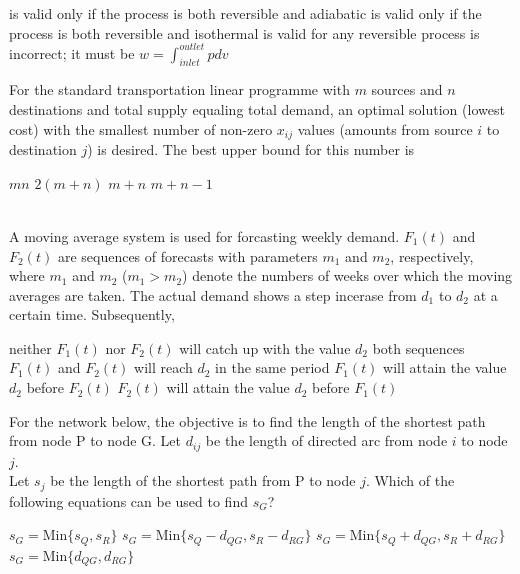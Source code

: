 \documentclass[addpoints,11pt]{exam}
\begin{document}
\begin{questions}
        \begin{choices}
            \choice is valid only if the process is both reversible and adiabatic
            \choice is valid only if the process is both reversible and isothermal
            \choice is valid for any reversible process
            \choice is incorrect; it must be $w=\int_{inlet}^{outlet} pdv$
        \end{choices}

        \question For the standard transportation linear programme with $m$ sources and $n$ destinations and total supply equaling total demand, an optimal solution (lowest cost) with the smallest number of non-zero $x_{ij}$ values (amounts from source $i$ to destination $j$) is desired. The best upper bound for this number is\\

        \begin{oneparchoices}
            \choice $mn$
            \choice $2(m+n)$
            \choice $m+n$
            \choice $m+n-1$
        \end{oneparchoices}\\

        \question A moving average system is used for forcasting weekly demand. $F_1(t)$ and $F_2(t)$ are sequences of forecasts with parameters $m_1$ and $m_2$, respectively, where $m_1$ and $m_2$ ($m_1>m_2$) denote the numbers of weeks over which the moving averages are taken. The actual demand shows a step incerase from $d_1$ to $d_2$ at a certain time. Subsequently,\\

    \begin{choices}
        \choice neither $F_1(t)$ nor $F_2(t)$ will catch up with the value $d_2$
        \choice both sequences $F_1(t)$ and $F_2(t)$ will reach $d_2$ in the same period
        \choice $F_1(t)$ will attain the value $d_2$ before $F_2(t)$
        \choice $F_2(t)$ will attain the value $d_2$ before $F_1(t)$
    \end{choices}

    \question For the network below, the objective is to find the length of the shortest path from node P to node G. Let $d_{ij}$ be the length of directed arc from node $i$ to node $j$.%
    \\Let $s_j$ be the length of the shortest path from P to node $j$. Which of the following equations can be used to find $s_G$?

    \begin{choices}
        \choice $s_G = \text{Min}\{s_Q,s_R\}$
        \choice $s_G = \text{Min}\{s_Q-d_{QG},s_R-d_{RG}\}$
        \choice $s_G = \text{Min}\{s_Q+d_{QG},s_R+d_{RG}\}$
        \choice $s_G = \text{Min}\{d_{QG},d_{RG}\}$
    \end{choices}


\end{questions}
\end{document}

